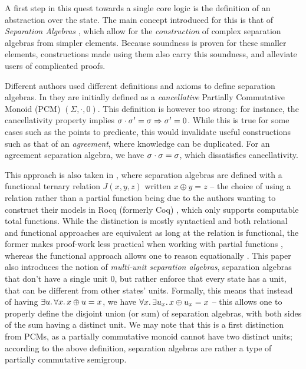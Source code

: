 A first step in this quest towards a single core logic is the definition of an abstraction over the state. The main concept introduced for this is that of \emph{Separation Algebras} \cite{abstractseplogic, sepalgebra}, which allow for the \emph{construction} of complex separation algebras from simpler elements. Because soundness is proven for these smaller elements, constructions made using them also carry this soundness, and alleviate users of complicated proofs.

Different authors used different definitions and axioms to define separation algebras. In \cite{abstractseplogic} they are initially defined as a \emph{cancellative} Partially Commutative Monoid (PCM) $(\Sigma, \cdot, 0)$. This definition is however too strong: for instance, the cancellativity property implies $\sigma\cdot\sigma'=\sigma \Rightarrow \sigma'=0$. While this is true for some cases such as the points to predicate, this would invalidate useful constructions such as that of an \emph{agreement}, where knowledge can be duplicated. For an agreement separation algebra, we have $\sigma \cdot \sigma = \sigma$, which dissatisfies cancellativity.

This approach is also taken in \cite{sepalgebra}, where separation algebras are defined with a functional ternary relation $J(x,y,z)$ written $x\oplus y=z$ -- the choice of using a relation rather than a partial function being due to the authors wanting to construct their models in Rocq (formerly Coq) \cite{coq}, which only supports computable total functions. While the distinction is mostly syntactical and both relational and functional approaches are equivalent as long at the relation is functional, the former makes proof-work less practical when working with partial functions \cite{statesoundness}, whereas the functional approach allows one to reason equationally \cite{iris}. This paper also introduces the notion of \emph{multi-unit separation algebras}, separation algebras that don't have a single unit $0$, but rather enforce that every state has a unit, that can be different from other states' units. Formally, this means that instead of having $\exists u\ldotp \forall x\ldotp x \oplus u = x$, we have $\forall x\ldotp\exists u_x\ldotp x\oplus u_x=x$ -- this allows one to properly define the disjoint union (or sum) of separation algebras, with both sides of the sum having a distinct unit. We may note that this is a first distinction from PCMs, as a partially commutative monoid cannot have two distinct units; according to the above definition, separation algebras are rather a type of partially commutative semigroup.

